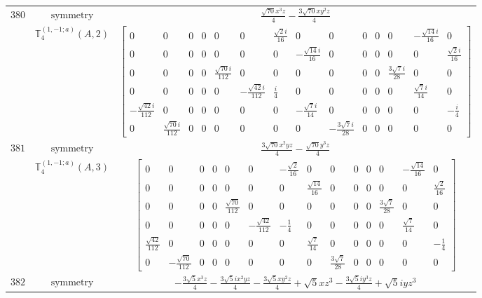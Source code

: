 \documentclass[fleqn,8pt,landscape]{jsarticle}
\begin{document}
\begin{longtable}{ccc}
$ 380 $ & $ \text{symmetry} $ & $ \frac{\sqrt{70} x^{3} z}{4} - \frac{3 \sqrt{70} x y^{2} z}{4} $ \\
$  $ & $ \mathbb{T}_{4}^{(1,-1;a)}(A,2) $ & $ \begin{bmatrix} 0 & 0 & 0 & 0 & 0 & 0 & \frac{\sqrt{2} i}{16} & 0 & 0 & 0 & 0 & 0 & - \frac{\sqrt{14} i}{16} & 0 \\ 0 & 0 & 0 & 0 & 0 & 0 & 0 & - \frac{\sqrt{14} i}{16} & 0 & 0 & 0 & 0 & 0 & \frac{\sqrt{2} i}{16} \\ 0 & 0 & 0 & 0 & \frac{\sqrt{70} i}{112} & 0 & 0 & 0 & 0 & 0 & 0 & \frac{3 \sqrt{7} i}{28} & 0 & 0 \\ 0 & 0 & 0 & 0 & 0 & - \frac{\sqrt{42} i}{112} & \frac{i}{4} & 0 & 0 & 0 & 0 & 0 & \frac{\sqrt{7} i}{14} & 0 \\ - \frac{\sqrt{42} i}{112} & 0 & 0 & 0 & 0 & 0 & 0 & - \frac{\sqrt{7} i}{14} & 0 & 0 & 0 & 0 & 0 & - \frac{i}{4} \\ 0 & \frac{\sqrt{70} i}{112} & 0 & 0 & 0 & 0 & 0 & 0 & - \frac{3 \sqrt{7} i}{28} & 0 & 0 & 0 & 0 & 0 \end{bmatrix} $ \\ \hline
$ 381 $ & $ \text{symmetry} $ & $ \frac{3 \sqrt{70} x^{2} y z}{4} - \frac{\sqrt{70} y^{3} z}{4} $ \\
$  $ & $ \mathbb{T}_{4}^{(1,-1;a)}(A,3) $ & $ \begin{bmatrix} 0 & 0 & 0 & 0 & 0 & 0 & - \frac{\sqrt{2}}{16} & 0 & 0 & 0 & 0 & 0 & - \frac{\sqrt{14}}{16} & 0 \\ 0 & 0 & 0 & 0 & 0 & 0 & 0 & \frac{\sqrt{14}}{16} & 0 & 0 & 0 & 0 & 0 & \frac{\sqrt{2}}{16} \\ 0 & 0 & 0 & 0 & \frac{\sqrt{70}}{112} & 0 & 0 & 0 & 0 & 0 & 0 & \frac{3 \sqrt{7}}{28} & 0 & 0 \\ 0 & 0 & 0 & 0 & 0 & - \frac{\sqrt{42}}{112} & - \frac{1}{4} & 0 & 0 & 0 & 0 & 0 & \frac{\sqrt{7}}{14} & 0 \\ \frac{\sqrt{42}}{112} & 0 & 0 & 0 & 0 & 0 & 0 & \frac{\sqrt{7}}{14} & 0 & 0 & 0 & 0 & 0 & - \frac{1}{4} \\ 0 & - \frac{\sqrt{70}}{112} & 0 & 0 & 0 & 0 & 0 & 0 & \frac{3 \sqrt{7}}{28} & 0 & 0 & 0 & 0 & 0 \end{bmatrix} $ \\ \hline
$ 382 $ & $ \text{symmetry} $ & $ - \frac{3 \sqrt{5} x^{3} z}{4} - \frac{3 \sqrt{5} i x^{2} y z}{4} - \frac{3 \sqrt{5} x y^{2} z}{4} + \sqrt{5} x z^{3} - \frac{3 \sqrt{5} i y^{3} z}{4} + \sqrt{5} i y z^{3} $ \\

\end{longtable}
\end{document}
